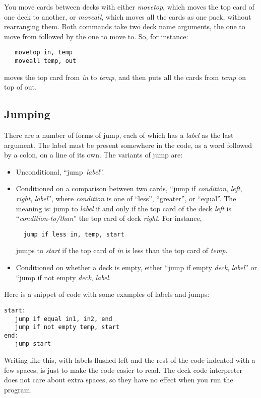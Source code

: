 \documentclass[a4paper,twoside]{tufte-handout}
\begin{document}
You move cards between decks with either \emph{movetop}, which moves
the top card of one deck to another, or \emph{moveall}, which moves
all the cards as one pack, without rearranging them. Both
commands take two deck name arguments, the one to move from followed
by the one to move to. So, for instance:
\begin{lstlisting}
   movetop in, temp
   moveall temp, out
\end{lstlisting}
moves the top card from \emph{in} to \emph{temp}, and then puts all
the cards from \emph{temp} on top of out.

\subsection{Jumping}\label{sec-}

There are a number of forms of jump, each of which has a \emph{label}
as the last argument. The label must be present somewhere in the code,
as a word followed by a colon, on a line of its own. The variants of
jump are:
\begin{itemize}
\item Unconditional, ``jump~\emph{label}''.
\item Conditioned on a comparison between two cards,
``jump if \emph{condition}, \emph{left}, \emph{right}, \emph{label}'',
where \emph{condition} is one of ``less'', ``greater'', or
``equal''. The meaning is: jump to \emph{label} if and only if the top
card of the deck \emph{left} is ``\emph{condition-to/than}'' the top card
of deck \emph{right}. For instance,
\begin{lstlisting}
  jump if less in, temp, start
\end{lstlisting}
jumps to \emph{start} if the top card of \emph{in} is less than the top card
of \emph{temp}.

\item Conditioned on whether a deck is empty, either ``jump if
  empty \emph{deck}, \emph{label}'' or ``jump if not empty \emph{deck},
  \emph{label}.
\end{itemize}

  
Here is a snippet of code with some examples of labels and jumps:
\begin{lstlisting}
start:
   jump if equal in1, in2, end
   jump if not empty temp, start
end:
   jump start
\end{lstlisting}

Writing like this, with labels flushed left and the rest of the code
indented with a few spaces, is just to make the code easier to
read. The deck code interpreter does not care about extra spaces, so
they have no effect when you run the program.
\end{document}
